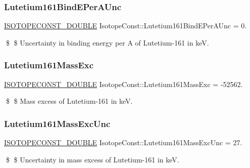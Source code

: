 \subsubsection{\texorpdfstring{Lutetium161\+Bind\+E\+Per\+A\+Unc}{Lutetium161BindEPerAUnc}}
{\footnotesize\ttfamily \mbox{\hyperlink{group___isotope_const-_macros_ga8f45a7272ce02c0b4c65c44636ed719a}{I\+S\+O\+T\+O\+P\+E\+C\+O\+N\+S\+T\+\_\+\+D\+O\+U\+B\+LE}} Isotope\+Const\+::\+Lutetium161\+Bind\+E\+Per\+A\+Unc = 0.}

\$ \$ Uncertainty in binding energy per A of Lutetium-\/161 in keV. \mbox{\label{group___isotope_const-_lutetium-_lu161_ga1fe3ad9d62c011bb78d59adbfc6b35fe}} 
\subsubsection{\texorpdfstring{Lutetium161\+Mass\+Exc}{Lutetium161MassExc}}
{\footnotesize\ttfamily \mbox{\hyperlink{group___isotope_const-_macros_ga8f45a7272ce02c0b4c65c44636ed719a}{I\+S\+O\+T\+O\+P\+E\+C\+O\+N\+S\+T\+\_\+\+D\+O\+U\+B\+LE}} Isotope\+Const\+::\+Lutetium161\+Mass\+Exc = -\/52562.}

\$ \$ Mass excess of Lutetium-\/161 in keV. \mbox{\label{group___isotope_const-_lutetium-_lu161_gad7a90b901e81922b9042ee570d8487e7}} 
\subsubsection{\texorpdfstring{Lutetium161\+Mass\+Exc\+Unc}{Lutetium161MassExcUnc}}
{\footnotesize\ttfamily \mbox{\hyperlink{group___isotope_const-_macros_ga8f45a7272ce02c0b4c65c44636ed719a}{I\+S\+O\+T\+O\+P\+E\+C\+O\+N\+S\+T\+\_\+\+D\+O\+U\+B\+LE}} Isotope\+Const\+::\+Lutetium161\+Mass\+Exc\+Unc = 27.}

\$ \$ Uncertainty in mass excess of Lutetium-\/161 in keV. \mbox{\label{group___isotope_const-_lutetium-_lu161_ga76e1bf7eb3f767a28a636c7e3d712329}} 
